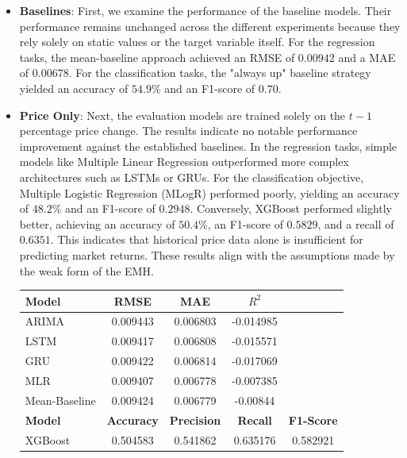 \documentclass[Master,english,IEEE]{twbook}
\begin{document}
\begin{itemize}
    \item \textbf{Baselines}: First, we examine the performance of the baseline models. Their performance remains unchanged across the different experiments because they rely solely on static values or the target variable itself. For the regression tasks, the mean-baseline approach achieved an RMSE of $0.00942$ and a MAE of $0.00678$. For the classification tasks, the "always up" baseline strategy yielded an accuracy of $54.9$\% and an F1-score of $0.70$.
    \item \textbf{Price Only}: Next, the evaluation models are trained solely on the $t-1$ percentage price change. The results indicate no notable performance improvement against the established baselines. In the regression tasks, simple models like Multiple Linear Regression outperformed more complex architectures such as LSTMs or GRUs. For the classification objective, Multiple Logistic Regression (MLogR) performed poorly, yielding an accuracy of $48.2$\% and an F1-score of $0.2948$. Conversely, XGBoost performed slightly better, achieving an accuracy of $50.4$\%, an F1-score of $0.5829$, and a recall of $0.6351$. This indicates that historical price data alone is insufficient for predicting market returns. These results align with the assumptions made by the weak form of the EMH.
    \begin{table}[H]
    \centering
    \small %
    \setlength{\tabcolsep}{4pt} %
    \begin{tabular}{|lcccc|}
        \hline
        \textbf{Model} & \textbf{RMSE} & \textbf{MAE} & \textbf{$R^2$} & \\
        \hline
        ARIMA          & 0.009443      & 0.006803     & -0.014985      & \\
        LSTM           & 0.009417      & 0.006808     & -0.015571      & \\
        GRU            & 0.009422      & 0.006814     & -0.017069      & \\
        MLR            & 0.009407      & 0.006778     & -0.007385      & \\
        Mean-Baseline  & 0.009424      & 0.006779     & -0.00844       & \\
        \hline
        \textbf{Model} & \textbf{Accuracy} & \textbf{Precision} & \textbf{Recall} & \textbf{F1-Score} \\
        \hline
        XGBoost        & 0.504583      & 0.541862     & 0.635176       & 0.582921 \\

\end{tabular}
\end{table}
\end{itemize}
\end{document}
